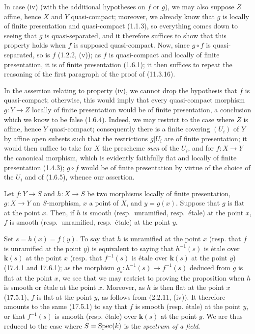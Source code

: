 In case (iv) (with the additional hypotheses on $f$ or $g$), we may also suppose $Z$ affine, hence $X$ and $Y$ quasi-compact; moreover, we already know that $g$ is locally of finite presentation and quasi-compact (1.1.3), so everything comes down to seeing that $g$ is quasi-separated, and it therefore suffices to show that this property holds when $f$ is supposed quasi-compact. Now, since $g\circ f$ is quasi-separated, so is $f$ (1.2.2, (v)); as $f$ is quasi-compact and locally of finite presentation, it is of finite presentation (1.6.1); it then suffices to repeat the reasoning of the first paragraph of the proof of (11.3.16).

\begin{remark}[17.7.6]
\label{IV.17.7.6}
In the assertion relating to property (iv), we cannot drop the hypothesis that $f$ is quasi-compact; otherwise, this would imply that every quasi-compact morphism $g:Y\to Z$ locally of finite presentation would be of finite presentation, a conclusion which we know to be false (1.6.4). Indeed, we may restrict to the case where $Z$ is affine, hence $Y$ quasi-compact; consequently there is a finite covering $(U_i)$ of $Y$ by affine open subsets such that the restrictions $g|U_i$ are of finite presentation; it would then suffice to take for $X$ the prescheme \emph{sum} of the $U_i$, and for $f:X\to Y$ the canonical morphism, which is evidently faithfully flat and locally of finite presentation (1.4.3); $g\circ f$ would be of finite presentation by virtue of the choice of the $U_i$ and of (1.6.5), whence our assertion.
\end{remark}

\begin{proposition}[17.7.7]
\label{IV.17.7.7}
Let $f:Y\to S$ and $h:X\to S$ be two morphisms locally of finite presentation, $g:X\to Y$ an $S$-morphism, $x$ a point of $X$, and $y=g(x)$. Suppose that $g$ is \textup{flat} at the point $x$. Then, if $h$ is smooth \textup{(resp.}\ unramified, \textup{resp.}\ étale\textup{)} at the point $x$, $f$ is smooth \textup{(resp.}\ unramified, \textup{resp.}\ étale\textup{)} at the point $y$.
\end{proposition}

Set $s=h(x)=f(y)$. To say that $h$ is unramified at the point $x$ (resp. that $f$ is unramified at the point $y$) is equivalent to saying that $h^{-1}(s)$ is étale over $\boldsymbol{k}(s)$ at the point $x$ (resp. that $f^{-1}(s)$ is étale over $\boldsymbol{k}(s)$ at the point $y$) (17.4.1 and 17.6.1); as the morphism $g_s:h^{-1}(s)\to f^{-1}(s)$ deduced from $g$ is flat at the point $x$, we see that we may restrict to proving the proposition when $h$ is smooth or étale at the point $x$. Moreover, as $h$ is then flat at the point $x$ (17.5.1), $f$ is flat at the point $y$, as follows from (2.2.11, (iv)). It therefore amounts to the same (17.5.1) to say that $f$ is smooth (resp. étale) at the point $y$, or that $f^{-1}(s)$ is smooth (resp. étale) over $\boldsymbol{k}(s)$ at the point $y$. We are thus reduced to the case where $S=\operatorname{Spec}(k)$ is the \emph{spectrum of a field}.

